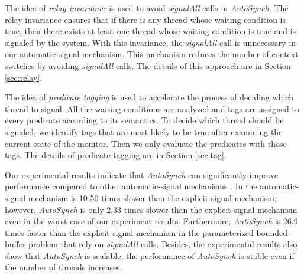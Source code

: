 \documentclass[preprint]{sigplanconf}
\begin{document}
The idea of {\em relay invariance} is used to avoid {\em signalAll} calls in {\em
AutoSynch}.
The relay invariance ensures that if there is any thread whose waiting condition is true, then
there exists at least one thread whose waiting condition is  true and is signaled by the system.
With this invariance, the {\em signalAll} call 
is unnecessary in our automatic-signal mechanism. This mechanism reduces 
the number of context switches by avoiding {\em signalAll} calls. 
The details of this approach are in Section \ref{sec:relay}.


The idea of {\em predicate tagging} is used to accelerate the process of deciding which thread to signal.
All the waiting conditions are analyzed and tags are assigned to every predicate
according to its semantics. To decide which thread should be 
signaled, we identify tags that are most likely to be true after examining the 
current state of the monitor. Then we only evaluate the predicates with 
those tags. 
The details of predicate tagging are in Section \ref{sec:tag}.

Our experimental results indicate that {\em AutoSynch} can significantly improve
performance compared to other automatic-signal mechanisms \cite{bh05}. In \cite{bfc95,bh05}
the automatic-signal mechanism is 10-50 times
slower than the explicit-signal mechanism; however, {\em AutoSynch} is 
only 2.33 times slower than the explicit-signal mechanism even in the worst 
case of our experiment results. Furthermore, {\em AutoSynch} is 26.9
times faster than the explicit-signal mechanism in the parameterized
bounded-buffer problem that rely on 
{\em signalAll} calls. Besides, the experimental results also show that {\em AutoSynch} 
is scalable; the performance of {\em AutoSynch} is stable even if the number of 
threads increases. 
\end{document}
